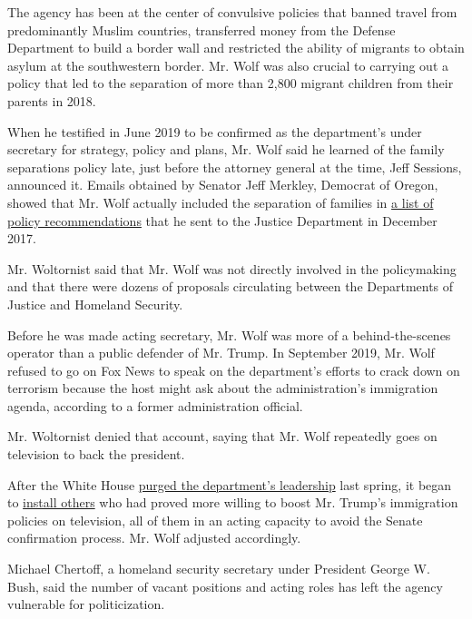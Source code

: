 The agency has been at the center of convulsive policies that banned
travel from predominantly Muslim countries, transferred money from the
Defense Department to build a border wall and restricted the ability of
migrants to obtain asylum at the southwestern border. Mr. Wolf was also
crucial to carrying out a policy that led to the separation of more than
2,800 migrant children from their parents in 2018.

When he testified in June 2019 to be confirmed as the department's under
secretary for strategy, policy and plans, Mr. Wolf said he learned of
the family separations policy late, just before the attorney general at
the time, Jeff Sessions, announced it. Emails obtained by Senator Jeff
Merkley, Democrat of Oregon, showed that Mr. Wolf actually included the
separation of families in
\href{https://www.nbcnews.com/politics/immigration/watchdog-group-trump-dhs-pick-made-false-claims-about-role-n1078171}{a
list of policy recommendations} that he sent to the Justice Department
in December 2017.

Mr. Woltornist said that Mr. Wolf was not directly involved in the
policymaking and that there were dozens of proposals circulating between
the Departments of Justice and Homeland Security.

Before he was made acting secretary, Mr. Wolf was more of a
behind-the-scenes operator than a public defender of Mr. Trump. In
September 2019, Mr. Wolf refused to go on Fox News to speak on the
department's efforts to crack down on terrorism because the host might
ask about the administration's immigration agenda, according to a former
administration official.

Mr. Woltornist denied that account, saying that Mr. Wolf repeatedly goes
on television to back the president.

After the White House
\href{https://www.nytimes3xbfgragh.onion/2019/04/08/us/politics/randolph-alles-secret-service.html}{purged
the department's leadership} last spring, it began to
\href{https://www.nytimes3xbfgragh.onion/2019/09/05/us/politics/ken-cuccinelli-immigration-trump.html}{install
others} who had proved more willing to boost Mr. Trump's immigration
policies on television, all of them in an acting capacity to avoid the
Senate confirmation process. Mr. Wolf adjusted accordingly.

Michael Chertoff, a homeland security secretary under President George
W. Bush, said the number of vacant positions and acting roles has left
the agency vulnerable for politicization.

